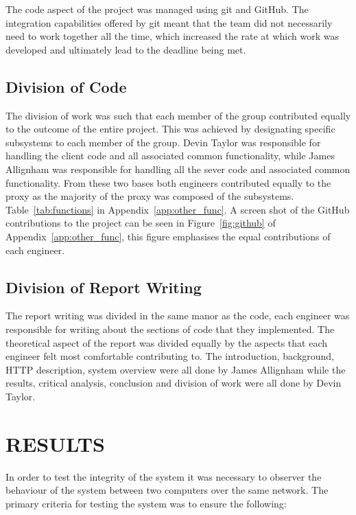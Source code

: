 \documentclass[10pt,twocolumn]{witseiepaper}
\begin{document}
		The code aspect of the project was managed using git and GitHub. The integration capabilities offered by git meant that the team did not necessarily need to work together all the time, which increased the rate at which work was developed and ultimately lead to the deadline being met. 

	\subsection{Division of Code}
	
		The division of work was such that each member of the group contributed equally to the outcome of the entire project. This was achieved by designating specific subsystems to each member of the group. Devin Taylor was responsible for handling the client code and all associated common functionality, while James Allignham was responsible for handling all the sever code and associated common functionality. From these two bases both engineers contributed equally to the proxy as the majority of the proxy was composed of the subsystems. Table~\ref{tab:functions} in Appendix~\ref{app:other_func}. A screen shot of the GitHub contributions to the project can be seen in Figure~\ref{fig:github} of Appendix~\ref{app:other_func}, this figure emphasises the equal contributions of each engineer. 
	
	\subsection{Division of Report Writing}
	
		The report writing was divided in the same manor as the code, each engineer was responsible for writing about the sections of code that they implemented. The theoretical aspect of the report was divided equally by the aspects that each engineer felt most comfortable contributing to. The introduction, background, HTTP description, system overview were all done by James Allignham while the results, critical analysis, conclusion and division of work were all done by Devin Taylor.
	

\section{RESULTS}

	In order to test the integrity of the system it was necessary to observer the behaviour of the system between two computers over the same network. The primary criteria for testing the system was to ensure the following:
\end{document}

